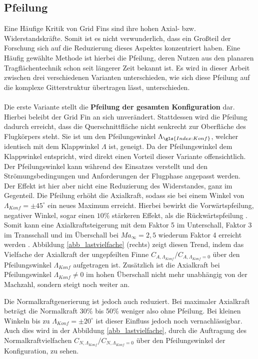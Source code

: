 \subsection{Pfeilung}
Eine Häufige Kritik von Grid Fins sind ihre hohen Axial- bzw. Widerstandskräfte. Somit ist es nicht verwunderlich, dass ein Großteil der Forschung sich auf die Reduzierung dieses Aspektes konzentriert haben. Eine Häufig gewählte Methode ist hierbei die Pfeilung, deren Nutzen aus den planaren Tragflächentechnik schon seit längerer Zeit bekannt ist. Es wird in dieser Arbeit zwischen drei verschiedenen Varianten unterschieden, wie sich diese Pfeilung auf die komplexe Gitterstruktur übertragen lässt, unterschieden.\\
~\\
Die erste Variante stellt die \textbf{Pfeilung der gesamten Konfiguration} dar. Hierbei beleibt der Grid Fin an sich unverändert. Stattdessen wird die Pfeilung dadurch erreicht, dass die Querschnittfläche nicht senkrecht zur Oberfläche des Flugkörpers steht. Sie ist um den Pfeilungswinkel $\Lambda_{\gls{Index:Konf}}$, welcher identisch mit dem Klappwinkel $\Lambda$ ist, geneigt. Da der Pfeilungswinkel dem Klappwinkel entspricht, wird direkt einen Vorteil dieser Variante offensichtlich. Der Pfeilungswinkel kann während des Einsatzes verstellt und den Strömungsbedingungen und Anforderungen der Flugphase angepasst werden.\\
Der Effekt ist hier aber nicht eine Reduzierung des Widerstandes, ganz im Gegenteil. Die Pfeilung erhöht die Axialkraft, sodass sie bei einem Winkel von $\Lambda_{Konf} = \pm45^\circ$ ein neues Maximum erreicht. Hierbei bewirkt die Vorwärtspfeilung, negativer Winkel, sogar einen $10\%$ stärkeren Effekt, als die Rückwärtspfeilung \cite{LambdaKonf}. Somit kann eine Axialkraftsteigerung mit dem Faktor 5 im Unterschall, Faktor 3 im Transschall und im Überschall bei $Ma_\infty = 2,5$ wiederum Faktor 4 erreicht werden \cite{LambdaKonf}. Abbildung \ref{abb_lastvielfache} (rechts) zeigt diesen Trend, indem das Vielfache der Axialkraft der ungepfeilten Finne $C_{A,\Lambda_{Konf}}/C_{A,\Lambda_{Konf}=0}$ über den Pfeilungswinkel $\Lambda_{Konf}$ aufgetragen ist. Zusätzlich ist die Axialkraft bei Pfeilungswinkel $\Lambda_{Konf} \neq 0$ im hohen Überschall nicht mehr unabhängig von der Machzahl, sondern steigt noch weiter an.

Die Normalkraftgenerierung ist jedoch auch reduziert. Bei maximaler Axialkraft beträgt die Normalkraft 30\% bis 50\% weniger also ohne Pfeilung. Bei kleinen Winkeln bis zu $\Lambda_{Konf} = \pm20^\circ$ ist dieser Einfluss jedoch noch vernachlässigbar. Auch dies wird in der Abbildung \ref{abb_lastvielfache}, durch die Auftragung des Normalkraftvielfachen $C_{N,\Lambda_{Konf}}/C_{N,\Lambda_{Konf}=0}$ über den Pfeilungswinkel der Konfiguration, zu sehen.


